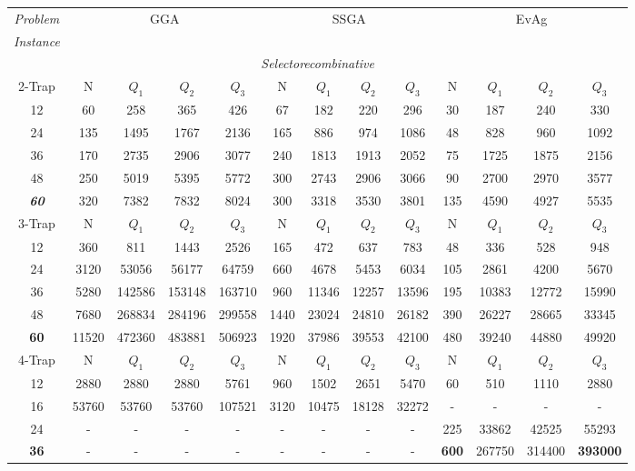 \begin{sidewaystable}[htbp]
\centering
{\tiny
\begin{tabular}{c|c c c c|c c c c|c c c c|}

{\it Problem}&\multicolumn{4}{|c|}{GGA}&\multicolumn{4}{|c|}{SSGA}&\multicolumn{4}{|c|}{EvAg}\\
{\it Instance}&\multicolumn{4}{|c|}{}&\multicolumn{4}{|c|}{}&\multicolumn{4}{|c|}{}\\
\hline
\multicolumn{13}{c}{{\it Selectorecombinative}}\\
\hline
2-Trap&N&$Q_1$&$Q_2$&$Q_3$&N&$Q_1$&$Q_2$&$Q_3$&N&$Q_1$&$Q_2$&{\it {\bf $Q_3$}}\\
\hline
12&60&258&365&426&67 &182 &220 &296 &30&187&240&330\\
24&135&1495&1767&2136& 165 &886  &974  &1086  &48&828&960&1092\\
36&170&2735&2906&3077& 240 &1813  &1913  &2052  &75&1725&1875&2156\\
48&250&5019&5395&5772& 300 & 2743 &2906   & 3066  &90&2700&2970&3577\\
{\it {\bf 60}}&320&7382&7832&8024& 300 & 3318 & 3530 & 3801 & 135&4590&4927&5535\\
\hline
3-Trap&N&$Q_1$&$Q_2$&$Q_3$&N&$Q_1$&$Q_2$&$Q_3$&N&$Q_1$&$Q_2$&{\bf $Q_3$}\\
\hline
12&360&811&1443&2526&165 &472 & 637 & 783  &48&336&528&948\\
24&3120&53056&56177&64759&660  &4678  &5453  &6034  &105&2861&4200&5670\\
36&5280&142586&153148&163710& 960 & 11346 & 12257 & 13596 &195&10383&12772&15990\\
48&7680&268834&284196&299558& 1440 & 23024 & 24810 & 26182 &390&26227&28665&33345\\
{\bf 60}&11520&472360&483881&506923& 1920 & 37986 & 39553& 42100 & 480&39240&44880& 49920\\
\hline
4-Trap&N&$Q_1$&$Q_2$&$Q_3$&N&$Q_1$&$Q_2$&$Q_3$&N&$Q_1$&$Q_2$&{\bf $Q_3$}\\
\hline
12& 2880&2880 &2880 &5761  &960  &1502  &2651  &5470 &60&510&1110&2880\\
16& 53760  & 53760 & 53760 & 107521 & 3120& 10475& 18128 &32272 &-&-&-&-\\
24&-&-&-&-&-&-&-&-&225&33862&42525&55293\\
{\bf 36}&-&-&-&-&-&-&-&-&{\bf 600}&267750&314400&{\bf 393000}\\

\end{tabular}}
\end{sidewaystable}
